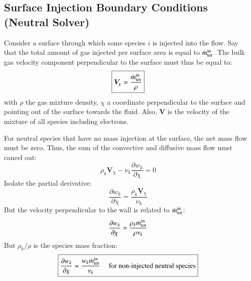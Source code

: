 \documentclass{warpdoc}
\newcommand\frameeqn[1]{\fbox{$\displaystyle #1$}}
\renewcommand{\vec}[1]{\bm{#1}}
\begin{document}
\subsection{Surface Injection Boundary Conditions (Neutral Solver)}

Consider a surface through which some species $i$ is injected into the flow. Say that the total amount of gas injected per surface area is equal to $\dot{m}^{\rm in}_{\rm tot}$. The bulk gas velocity component perpendicular to the surface must thus be equal to:
%
\begin{equation}
\frameeqn{
  \vec{V}_\chi = \frac{\dot{m}^{\rm in}_{\rm tot}}{\rho}
 }
\end{equation}
%
with $\rho$ the gas mixture density, $\chi$ a coordinate perpendicular to the surface and pointing out of the surface towards the fluid. Also, $\vec{V}$ is the  velocity of the mixture of all species including electrons.  

For neutral species that have no mass injection at the surface, the net mass flow must be zero. Thus, the sum of the convective and diffusive mass flow must cancel out:
%
\begin{equation}
  \rho_k \vec{V}_\chi - \nu_k \frac{\partial w_k}{\partial \chi} =0
\end{equation}
%
Isolate the partial derivative:
%
\begin{equation}
 \frac{\partial w_k}{\partial \chi}= \frac{\rho_k \vec{V}_\chi}{\nu_k} 
\end{equation}
%
But the velocity perpendicular to the wall is related to $\dot{m}^{\rm in}_{\rm tot}$:
%
\begin{equation}
 \frac{\partial w_k}{\partial \chi}= \frac{\rho_k \dot{m}^{\rm in}_{\rm tot}}{\rho \nu_k} 
\end{equation}
%
But $\rho_k/\rho$ is the species mass fraction:
%
\begin{equation}
\frameeqn{
 \frac{\partial w_k}{\partial \chi}= \frac{w_k \dot{m}^{\rm in}_{\rm tot}}{\nu_k} ~~~~~\textrm{for~non-injected~neutral~species}
}
\end{equation}
%
\end{document}
